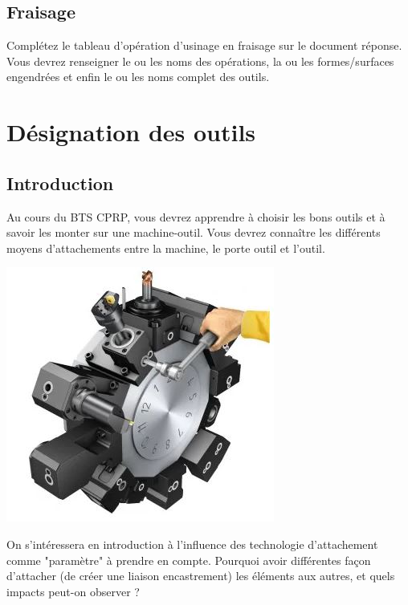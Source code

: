 \documentclass[12pt]{article}
\newcounter{exo}
\newenvironment{exo}{\stepcounter{exo}\vspace{0.5cm}{\bfseries Question \theexo\ :}}{\par\vspace{0.5cm}}
\begin{document}
\subsection{Fraisage}
\begin{exo} Complétez le tableau d'opération d'usinage en fraisage sur le document réponse. Vous devrez renseigner le ou les noms des opérations, la ou les formes/surfaces engendrées et enfin le ou les noms complet des outils.  \end{exo}






\section{Désignation des outils}
\subsection{Introduction}


\begin{minipage}{.55\linewidth}
Au cours du BTS CPRP, vous devrez apprendre à choisir les bons outils et à savoir les monter sur une machine-outil. Vous devrez connaître les différents moyens d’attachements entre la machine, le porte outil et l’outil.
\end{minipage}
\begin{minipage}{.44\linewidth}
\includegraphics[width=0.7\linewidth]{Images/Outil2.JPG}
\end{minipage}



On s'intéressera en introduction à l'influence des technologie d'attachement comme "paramètre" à prendre en compte. Pourquoi avoir différentes façon d'attacher (de créer une liaison encastrement) les éléments aux autres, et quels impacts peut-on observer ? \\
\end{document}
